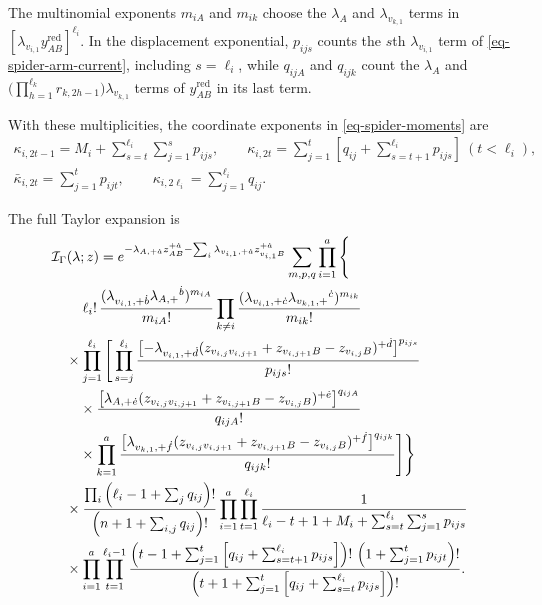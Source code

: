 \documentclass[11pt]{article}
\numberwithin{equation}{section}
\numberwithin{figure}{section}
\numberwithin{table}{section}
\begin{document}
The multinomial exponents $m_{iA}$ and $m_{ik}$ choose the $\lambda_A$ and $\lambda_{v_{k,1}}$ terms in $[\lambda_{v_{i,1}}y^{\mathrm{red}}_{AB}]^{\ell_i}$. In the displacement exponential, $p_{ijs}$ counts the $s$th $\lambda_{v_{i,1}}$ term of \eqref{eq-spider-arm-current}, including $s=\ell_i$, while $q_{ijA}$ and $q_{ijk}$ count the $\lambda_A$ and $\bigl(\prod_{h=1}^{\ell_k}r_{k,2h-1}\bigr)\lambda_{v_{k,1}}$ terms of $y^{\mathrm{red}}_{AB}$ in its last term.

With these multiplicities, the coordinate exponents in \eqref{eq-spider-moments} are
\begin{equation}\label{eq-spider-taylor-exponents}
\begin{gathered}
\kappa_{i,2t-1}=M_i+\sum_{s=t}^{\ell_i}\sum_{j=1}^{s}p_{ijs},\qquad
\kappa_{i,2t}=\sum_{j=1}^{t}\left[q_{ij}+\sum_{s=t+1}^{\ell_i}p_{ijs}\right]\ (t<\ell_i),\\
\bar\kappa_{i,2t}=\sum_{j=1}^{t}p_{ijt},\qquad
\kappa_{i,2\ell_i}=\sum_{j=1}^{\ell_i}q_{ij}.
\end{gathered}
\end{equation}

The full Taylor expansion is
\begin{equation}\label{eq-spider-full-taylor}
\begin{aligned}
&\mathcal I_\Gamma(\lambda;z)
=e^{-\lambda_{A,+\dot a}z_{AB}^{+\dot a}
-\sum_i\lambda_{v_{i,1},+\dot a}z_{v_{i,1}B}^{+\dot a}}
\sum_{m,p,q}\prod_{i=1}^a\Bigg\{\\
&\quad\hphantom{{}\times{}}\ell_i!\,
\frac{(\lambda_{v_{i,1},+\dot b}\lambda_{A,+}{}^{\dot b})^{m_{iA}}}{m_{iA}!}
\prod_{k\ne i}
\frac{(\lambda_{v_{i,1},+\dot c}\lambda_{v_{k,1},+}{}^{\dot c})^{m_{ik}}}{m_{ik}!}\\
&\quad\times\prod_{j=1}^{\ell_i}\Bigg[
\prod_{s=j}^{\ell_i}
\frac{\bigl[-\lambda_{v_{i,1},+\dot d}
(z_{v_{i,j}v_{i,j+1}}+z_{v_{i,j+1}B}-z_{v_{i,j}B})^{+\dot d}\bigr]^{p_{ijs}}}{p_{ijs}!}\\
&\qquad\times
\frac{\bigl[\lambda_{A,+\dot e}
(z_{v_{i,j}v_{i,j+1}}+z_{v_{i,j+1}B}-z_{v_{i,j}B})^{+\dot e}\bigr]^{q_{ijA}}}{q_{ijA}!}\\
&\qquad\times\prod_{k=1}^a
\frac{\bigl[\lambda_{v_{k,1},+\dot f}
(z_{v_{i,j}v_{i,j+1}}+z_{v_{i,j+1}B}-z_{v_{i,j}B})^{+\dot f}\bigr]^{q_{ijk}}}{q_{ijk}!}
\Bigg]\Bigg\}\\
&\quad\times
\frac{\prod_i\left(\ell_i-1+\sum_{j}q_{ij}\right)!}
{\left(n+1+\sum_{i,j}q_{ij}\right)!}
\prod_{i=1}^a\prod_{t=1}^{\ell_i}
\frac1{\ell_i-t+1+M_i+\sum_{s=t}^{\ell_i}\sum_{j=1}^{s}p_{ijs}}\\
&\quad\times\prod_{i=1}^a\prod_{t=1}^{\ell_i-1}
\frac{\left(t-1+\sum_{j=1}^{t}\left[q_{ij}+\sum_{s=t+1}^{\ell_i}p_{ijs}\right]\right)!\,
\left(1+\sum_{j=1}^{t}p_{ijt}\right)!}
{\left(t+1+\sum_{j=1}^{t}\left[q_{ij}+\sum_{s=t}^{\ell_i}p_{ijs}\right]\right)!}.
\end{aligned}
\end{equation}
\end{document}
